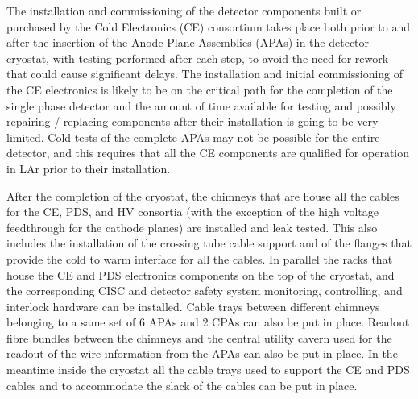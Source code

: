 The installation and commissioning of the detector components built or
purchased by the Cold Electronics (CE) consortium takes place both prior to
and after the insertion of the Anode Plane Assemblies (APAs) in the
detector cryostat, with testing performed after each step, to avoid the
need for rework that could cause significant delays. The installation and
initial commissioning of the CE electronics is likely to be on the critical
path for the completion of the single phase detector and the amount of
time available for testing and possibly repairing / replacing components
after their installation is going to be very limited. Cold tests of the
complete APAs may not be possible for the entire detector, and this requires
that all the CE components are qualified for operation in LAr prior to their
installation.

After the completion of the cryostat, the chimneys that are house all the
cables for the CE, PDS, and HV consortia (with the exception of the high
voltage feedthrough for the cathode planes) are installed and leak tested.
This also includes the installation of the crossing tube cable support and of
the flanges that provide the cold to warm interface for all the cables.
In parallel the racks that house the CE and PDS electronics components on
the top of the cryostat, and the corresponding CISC and detector safety
system monitoring, controlling, and interlock hardware can be installed.
Cable trays between different chimneys belonging to a same set of 6 APAs
and 2 CPAs can also be put in place. Readout fibre bundles between the
chimneys and the central utility cavern used for the readout of the wire
information from the APAs can also be put in place. In the meantime inside
the cryostat all the cable trays used to support the CE and PDS cables and to
accommodate the slack of the cables can be put in place.

